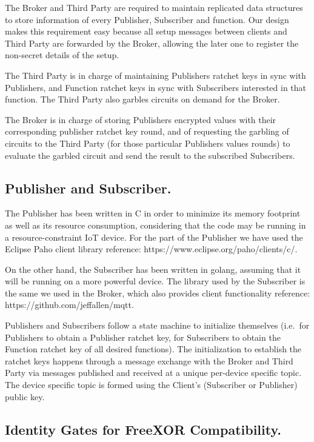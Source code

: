 The Broker and Third Party are required to maintain replicated data structures
to store information of every Publisher, Subscriber and function.  Our design
makes this requirement easy because all setup messages between clients and
Third Party are forwarded by the Broker, allowing the later one to register the
non-secret details of the setup.

The Third Party is in charge of maintaining Publishers ratchet keys in sync
with Publishers, and Function ratchet keys in sync with Subscribers interested
in that function.  The Third Party also garbles circuits on demand for the
Broker.

The Broker is in charge of storing Publishers encrypted values with their
corresponding publisher ratchet key round, and of requesting the garbling of
circuits to the Third Party (for those particular Publishers values rounds) to
evaluate the garbled circuit and send the result to the subscribed Subscribers.

\subsection{Publisher and Subscriber.}

The Publisher has been written in C in order to minimize its memory footprint
as well as its resource consumption, considering that the code may be running
in a resource-constraint IoT device.  For the \MQTT{} part of the Publisher we
have used the Eclipse Paho client library {reference:
https://www.eclipse.org/paho/clients/c/}.


On the other hand, the Subscriber has been written in golang, assuming that it
will be running on a more powerful device.  The \MQTT{} library used by the
Subscriber is the same we used in the Broker, which also provides client
functionality {reference: https://github.com/jeffallen/mqtt}.

Publishers and Subscribers follow a state machine to initialize themselves
(i.e.\ for Publishers to obtain a Publisher ratchet key, for Subscribers to
obtain the Function ratchet key of all desired functions).  The initialization
to establish the ratchet keys happens through a message exchange with the
Broker and Third Party via \MQTT{} messages published and received at a unique
per-device specific topic.  The device specific topic is formed using the
Client's (Subscriber or Publisher) public key.

\subsection{Identity Gates for FreeXOR Compatibility.}

